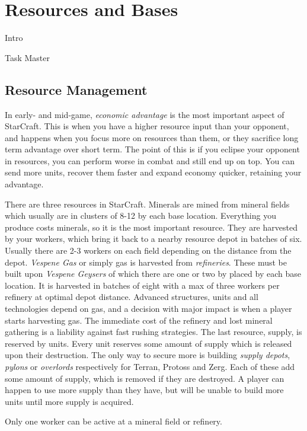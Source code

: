 \chapter{Resources and Bases}

Intro

Task Master

\section{Resource Management}
In early- and mid-game, \emph{economic advantage} is the most important aspect of StarCraft. This is when you have a higher resource input than your opponent, and happens when you focus more on resources than them, or they sacrifice long term advantage over short term. The point of this is if you eclipse your opponent in resources, you can perform worse in combat and still end up on top. You can send more units, recover them faster and expand economy quicker, retaining your advantage.

There are three resources in StarCraft. Minerals are mined from mineral fields which usually are in clusters of 8-12 by each base location. Everything you produce costs minerals, so it is the most important resource. They are harvested by your workers, which bring it back to a nearby resource depot in batches of six. Usually there are 2-3 workers on each field depending on the distance from the depot. \emph{Vespene Gas} or simply gas is harvested from \emph{refineries}. These must be built upon \emph{Vespene Geysers} of which there are one or two by placed by each base location. It is harvested in batches of eight with a max of three workers per refinery at optimal depot distance. Advanced structures, units and all technologies depend on gas, and a decision with major impact is when a player starts harvesting gas. The immediate cost of the refinery and lost mineral gathering is a liability against fast rushing strategies. The last resource, supply, is reserved by units. Every unit reserves some amount of supply which is released upon their destruction. The only way to secure more is building \emph{supply depots}, \emph{pylons} or \emph{overlords} respectively for Terran, Protoss and Zerg. Each of these add some amount of supply, which is removed if they are destroyed. A player can happen to use more supply than they have, but will be unable to build more units until more supply is acquired.

Only one worker can be active at a mineral field or refinery.

